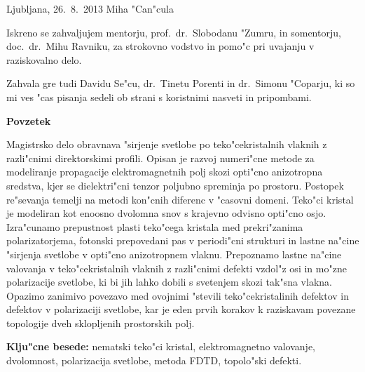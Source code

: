 \documentclass[12pt,twoside,openright,final]{report}
\begin{document}
\bigskip
\bigskip

\noindent
Ljubljana, 26.~8.~2013 \hfill Miha "Can"cula

\vfill

\newpage

\normalsize
\thispagestyle{empty}
\centerline{}
\vfill

\vfill

\vfill

\vfill


\par{\narrower\narrower\narrower\parindent 0pt

Iskreno se zahvaljujem mentorju, prof.~dr.~Slobodanu "Zumru, in somentorju, doc.~dr.~Mihu Ravniku, za strokovno vodstvo in pomo"c pri uvajanju v raziskovalno delo.

\quad

Zahvala gre tudi Davidu Se"cu, dr.~Tinetu Porenti in dr.~Simonu "Coparju, ki so mi ves "cas pisanja sedeli ob strani s koristnimi nasveti in pripombami. 

\par}

\vfill




\newpage

\normalsize
\thispagestyle{plain}

\vfill
\centerline{\bf Povzetek}
\bigskip
\noindent

Magistrsko delo obravnava "sirjenje svetlobe po teko"cekristalnih vlaknih z razli"cnimi direktorskimi profili. 
Opisan je razvoj numeri"cne metode za modeliranje propagacije elektromagnetnih polj skozi opti"cno anizotropna sredstva, kjer se dielektri"cni tenzor poljubno spreminja po prostoru. 
Postopek re"sevanja temelji na metodi kon"cnih diferenc v "casovni domeni. 
Teko"ci kristal je modeliran kot enoosno dvolomna snov s krajevno odvisno opti"cno osjo.
Izra"cunamo prepustnost plasti teko"cega kristala med prekri"zanima polarizatorjema, fotonski prepovedani pas v periodi"cni strukturi in lastne na"cine "sirjenja svetlobe v opti"cno anizotropnem vlaknu. 
Prepoznamo lastne na"cine valovanja v teko"cekristalnih vlaknih z razli"cnimi defekti vzdol"z osi in mo"zne polarizacije svetlobe, ki bi jih lahko dobili s svetenjem skozi tak"sna vlakna. 
Opazimo zanimivo povezavo med ovojnimi "stevili teko"cekristalinih defektov in defektov v polarizaciji svetlobe, kar je eden prvih korakov k raziskavam povezane topologije dveh sklopljenih prostorskih polj. 


\bigskip
\noindent
{\bf Klju"cne besede:} nematski teko"ci kristal, elektromagnetno valovanje, dvolomnost, polarizacija svetlobe, metoda FDTD, topolo"ski defekti.
\end{document}

